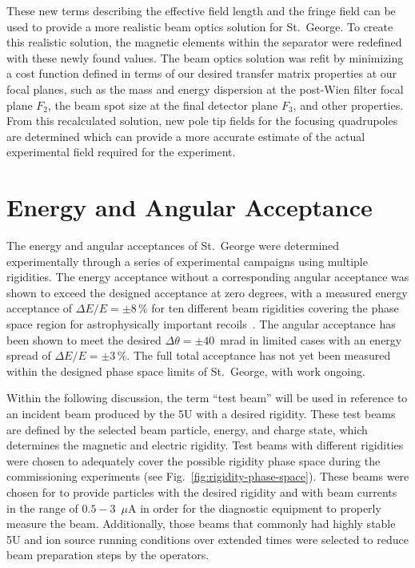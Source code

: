 These new terms describing the effective field length and the fringe
field can be used to provide a more realistic beam optics solution for
St.\ George. To create this realistic solution, the magnetic elements
within the separator were redefined with these newly found values. The
beam optics solution was refit by minimizing a cost function defined in
terms of our desired transfer matrix properties at our focal planes,
such as the mass and energy dispersion at the post-Wien filter focal
plane $F_2$, the beam spot size at the final detector plane $F_3$, and
other properties. From this recalculated solution, new pole tip fields
for the focusing quadrupoles are determined which can provide a more
accurate estimate of the actual experimental field required for the
experiment.


\section{Energy and Angular Acceptance}
\label{sec:commissioning}

The energy and angular acceptances of St.\ George were determined
experimentally through a series of experimental campaigns using multiple
rigidities. The energy acceptance without a corresponding angular
acceptance was shown to exceed the designed acceptance at zero degrees,
with a measured energy acceptance of $\Delta E/E = \pm 8$\,\% for ten
different beam rigidities covering the phase space region for
astrophysically important recoils~\cite{Meisel2017}. The angular
acceptance has been shown to meet the desired $\Delta\theta = \pm
40$~mrad in limited cases with an energy spread of $\Delta E/E = \pm
3$\,\%. The full total acceptance has not yet been measured within the
designed phase space limits of St.\ George, with work ongoing.

Within the following discussion, the term ``test beam'' will be used in
reference to an incident beam produced by the 5U with a desired
rigidity. These test beams are defined by the selected beam particle,
energy, and charge state, which determines the magnetic and electric
rigidity. Test beams with different rigidities were chosen to adequately
cover the possible rigidity phase space during the commissioning
experiments (see Fig.~\ref{fig:rigidity-phase-space}). These beams were
chosen for to provide particles with the desired rigidity and with beam
currents in the range of $0.5 - 3$~$\mu$A in order for the diagnostic
equipment to properly measure the beam. Additionally, those beams that
commonly had highly stable 5U and ion source running conditions over
extended times were selected to reduce beam preparation steps by the
operators.

